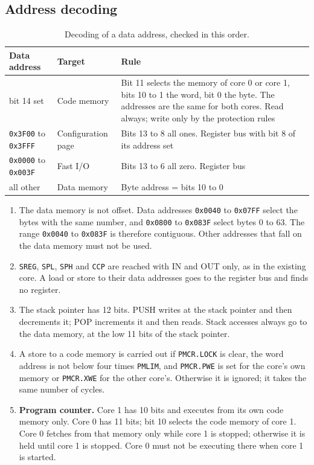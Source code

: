 \documentclass[10pt,a4paper]{article}
\newcommand{\reg}[1]{\texttt{#1}}
\begin{document}
\subsection{Address decoding}

\begin{table}[H]
\centering\small
\begin{tabularx}{\linewidth}{@{}llL@{}}
\toprule
Data address & Target & Rule \\
\midrule
bit 14 set & Code memory & Bit 11 selects the memory of core 0 or core 1, bits 10 to 1 the word, bit 0 the byte. The addresses are the same for both cores. Read always; write only by the protection rules \\
\texttt{0x3F00} to \texttt{0x3FFF} & Configuration page & Bits 13 to 8 all ones. Register bus with bit 8 of its address set \\
\texttt{0x0000} to \texttt{0x003F} & Fast I/O & Bits 13 to 6 all zero. Register bus \\
all other & Data memory & Byte address = bits 10 to 0 \\
\bottomrule
\end{tabularx}
\caption{Decoding of a data address, checked in this order.}
\end{table}

\begin{enumerate}[label=\textbf{M\arabic*},leftmargin=2.6em]
\item The data memory is not offset. Data addresses \texttt{0x0040} to \texttt{0x07FF} select the bytes with the
same number, and \texttt{0x0800} to \texttt{0x083F} select bytes 0 to 63. The range \texttt{0x0040} to
\texttt{0x083F} is therefore contiguous. Other addresses that fall on the data memory must not be used.
\item \reg{SREG}, \reg{SPL}, \reg{SPH} and \reg{CCP} are reached with IN and OUT only, as in the existing core. A
load or store to their data addresses goes to the register bus and finds no register.
\item The stack pointer has 12 bits. PUSH writes at the stack pointer and then decrements it; POP increments it and
then reads. Stack accesses always go to the data memory, at the low 11 bits of the stack pointer.
\item A store to a code memory is carried out if \reg{PMCR.LOCK} is clear, the word address is not below four
times \reg{PMLIM}, and \reg{PMCR.PWE} is set for the core's own memory or \reg{PMCR.XWE} for the other core's.
Otherwise it is ignored; it takes the same number of cycles.
\item \textbf{Program counter.} Core 1 has 10 bits and executes from its own code memory only. Core 0 has 11 bits;
bit 10 selects the code memory of core 1. Core 0 fetches from that memory only while core 1 is stopped; otherwise it is held until core 1 is stopped. Core 0 must not be executing there when core 1 is started.
\end{enumerate}
\end{document}
